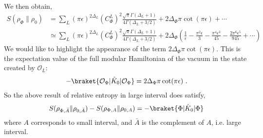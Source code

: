 \documentclass[11pt]{article}
\newcommand{\ep}{\epsilon}
\newcommand{\p}{\partial}
\newcommand{\mO}{\mathcal{O}}
\newcommand{\nn}{\nonumber}
\newcommand{\lb}{\left(}
\newcommand{\rb}{\right)}
\begin{document}
We then obtain,
\begin{align}
  S(\rho_\Phi\|\rho_0)&=\sum_L(\pi \ep)^{2\Delta_L}{(C_\Phi^L)}^2\frac{\sqrt{\pi}\Gamma(\Delta_L+1)}{4\Gamma(\Delta_L+3/2)} + 2\Delta_\Phi \pi \cot(\pi \ep) + \cdots \nn \\ 
&\simeq \sum_L(\pi \ep)^{2\Delta_L}{(C_\Phi^L)}^2\frac{\sqrt{\pi}\Gamma(\Delta_L+1)}{4\Gamma(\Delta_L+3/2)}  +2\Delta_\Phi\lb \frac{1}{\ep} - \frac{\pi^2 \ep}{3} - \frac{\pi^4 \ep^3}{45} - \frac{2\pi^6 \ep^5}{945} + \cdots\rb 
\end{align}
We would like to highlight the appearance of the term $2\Delta_\Phi\pi \cot(\pi \ep)$. This is the expectation value of the full modular Hamiltonian of the vacuum in the state created by $\mO_{L}$:
\begin{align}
    -\braket{\mO_\Phi|\hat{K}_0|\mO_\Phi}=2\Delta_\Phi\pi\cot(\pi \ep)\ .
\end{align}
So the above result of relative entropy in large interval does satisfy,
\begin{align}
    S(\rho_{\Phi,\bar{A}}\|\rho_{0,\bar{A}}) - S(\rho_{\Phi,A}\|\rho_{0,A}) = -\braket{\Phi|\hat{K}_0|\Phi}
\end{align}
where $A$ corresponds to small interval, and $\bar{A}$ is the complement of $A$, i.e. large interval. 
\end{document}
